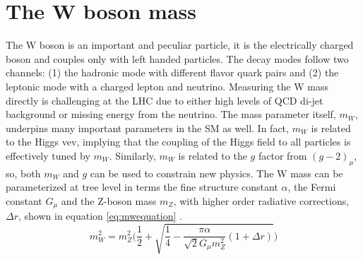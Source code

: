 

\section{The W boson mass}

The W boson is an important and peculiar particle, it is the electrically charged boson and couples only with left handed particles. The decay modes follow two channels: (1) the hadronic mode with different flavor quark pairs and (2) the leptonic mode with a charged lepton and neutrino. Measuring the W mass directly is challenging at the LHC due to either high levels of QCD di-jet background or missing energy from the neutrino. The mass parameter itself, $m_W$, underpins many important parameters in the SM as well. In fact, $m_W$ is related to the Higgs vev, implying that the coupling of the Higgs field to all particles is effectively tuned by $m_W$. Similarly, $m_W$ is related to the $g$ factor from $(g-2)_\mu$, so, both $m_W$ and $g$ can be used to constrain new physics. The W mass can be parameterized at tree level in terms the fine structure constant $\alpha$, the Fermi constant $G_\mu$ and the Z-boson mass $m_Z$, with higher order radiative corrections, $\Delta r$, shown in equation \ref{eq:mwequation} \cite{Awramik:2003rn}.
\begin{equation}
\label{eq:mwequation}
m_W^2 = m_Z^2\Bigg(\frac{1}{2} + \sqrt{\frac{1}{4} - \frac{\pi\alpha}{\sqrt{2}G_\mu m_{Z}^2 }(1+\Delta r) } \Bigg)
\end{equation}

